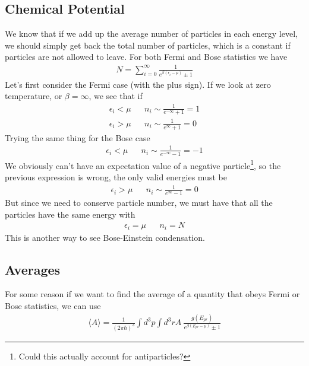 \subsection{Chemical Potential}
We know that if we add up the average number of particles in each energy level, we should simply get back the total number of particles, which is a constant if particles are not allowed to leave. For both Fermi and Bose statistics we have
\begin{align}
    N = \sum_{i=0}^\infty \frac{1}{e^{\beta(\epsilon_i - \mu)} \pm 1}
\end{align}
 Let's first consider the Fermi case (with the plus sign). If we look at zero temperature, or $\beta = \infty$, we see that if 
\begin{align}
    \epsilon_i < \mu  && n_i \sim \frac{1}{e^{-\infty} +1} = 1\\
    \epsilon_i > \mu  && n_i \sim \frac{1}{e^{\infty} +1} = 0
\end{align}
Trying the same thing for the Bose case
\begin{align}
    \epsilon_i < \mu  && n_i \sim \frac{1}{e^{-\infty} -1} = -1
\end{align}
We obviously can't have an expectation value of a negative particle\footnote{Could this actually account for antiparticles?}, so the previous expression is wrong, the only valid energies must be
\begin{align}
    \epsilon_i > \mu && n_i\sim \frac{1}{e^{\infty} -1} = 0
\end{align}
But since we need to conserve particle number, we must have that all the particles  have the same energy with
\begin{align}
    \epsilon_i = \mu && n_i = N
\end{align}
This is another way to see Bose-Einstein condensation. %


\subsection{Averages}
For some reason if we want to find the average of a quantity that obeys Fermi or Bose statistics, we can use
\begin{align}
    \langle A \rangle = \frac{1}{(2\pi\hbar)^3}\int d^3p \int d^3r A~\frac{g(E_{pr})}{e^{\beta(E_{pr} - \mu)}\pm 1}
\end{align}

